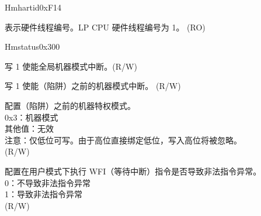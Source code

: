 \begin{register}{H}{mhartid}{0xF14}\label{regdesc:LPMHARTID}
%
\regnewline%
\begin{regdesc}\begin{reglist}
\label{fielddesc:LPMHARTID}\item [MHARTID] 表示硬件线程编号。LP CPU 硬件线程编号为 1。 (RO)
\end{reglist}\end{regdesc}
\end{register}

\begin{register}{H}{mstatus}{0x300}\label{regdesc:LPMSTATUS}
%
%
%
%
%
%
%
%
%
\regnewline%
\begin{regdesc}\begin{reglist}
\label{fielddesc:LPMSTATUSMIE}\item [MIE] 写 1 使能全局机器模式中断。(R/W)
\label{fielddesc:LPMSTATUSMPIE}\item [MPIE] 写 1 使能（陷阱）之前的机器模式中断。 (R/W)
\label{fielddesc:LPMSTATUSMPP}\item [MPP] 配置（陷阱）之前的机器特权模式。\\
0x3：机器模式\\
其他值：无效\\
注意：仅低位可写。由于高位直接绑定低位，写入高位将被忽略。\\
(R/W)
\label{fielddesc:LPMSTATUSTW}\item [TW] 配置在用户模式下执行 WFI（等待中断）指令是否导致非法指令异常。\\
0：不导致非法指令异常\\
1：导致非法指令异常\\
(R/W)
\end{reglist}\end{regdesc}
\end{register}


